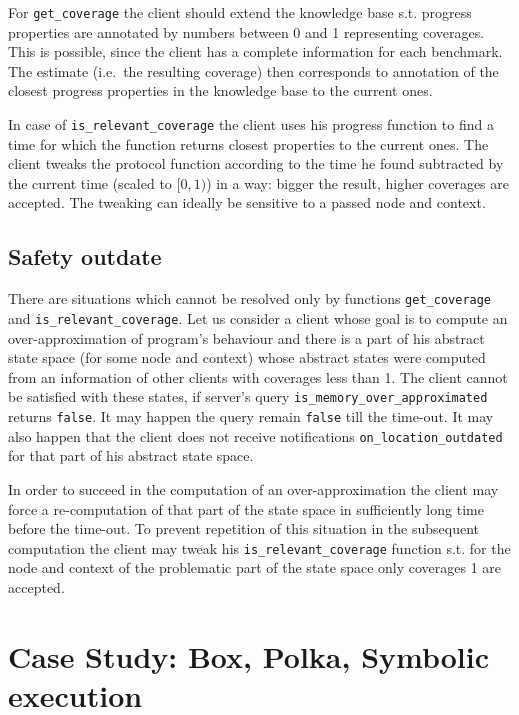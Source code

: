 \documentclass[envcountsame]{llncs}
\begin{document}
For \texttt{get\_coverage} the client should extend the knowledge base s.t.
progress properties are annotated by numbers between 0 and 1 representing
coverages. This is possible, since the client has a complete information for
each benchmark. The estimate (i.e.~the resulting coverage) then corresponds to
annotation of the closest progress properties in the knowledge base to the
current ones.

In case of \texttt{is\_relevant\_coverage} the client uses his progress function
to find a time for which the function returns closest properties to the current
ones. The client tweaks the protocol function according to the time he found
subtracted by the current time (scaled to $ [0,1) $) in a way: bigger the
result, higher coverages are accepted. The tweaking can ideally be sensitive to
a passed node and context.


\subsection{Safety outdate}
\label{sec:SafetyOutdate}

There are situations which cannot be resolved only by functions
\texttt{get\_coverage} and \texttt{is\_relevant\_coverage}. Let us consider a
client whose goal is to compute an over-approximation of program's behaviour and
there is a part of his abstract state space (for some node and context) whose
abstract states were computed from an information of other clients with
coverages less than 1. The client cannot be satisfied with these states, if
server's query \texttt{is\_memory\_over\_approximated} returns \texttt{false}.
It may happen the query remain \texttt{false} till the time-out. It may also
happen that the client does not receive notifications
\texttt{on\_location\_outdated} for that part of his abstract state space.

In order to succeed in the computation of an over-approximation the client may
force a re-computation of that part of the state space in sufficiently long time
before the time-out. To prevent repetition of this situation in the subsequent
computation the client may tweak his \texttt{is\_relevant\_coverage} function
s.t. for the node and context of the problematic part of the state space only
coverages 1 are accepted.


\section{Case Study: Box, Polka, Symbolic execution}
\label{sec:CaseStudy}
\end{document}
